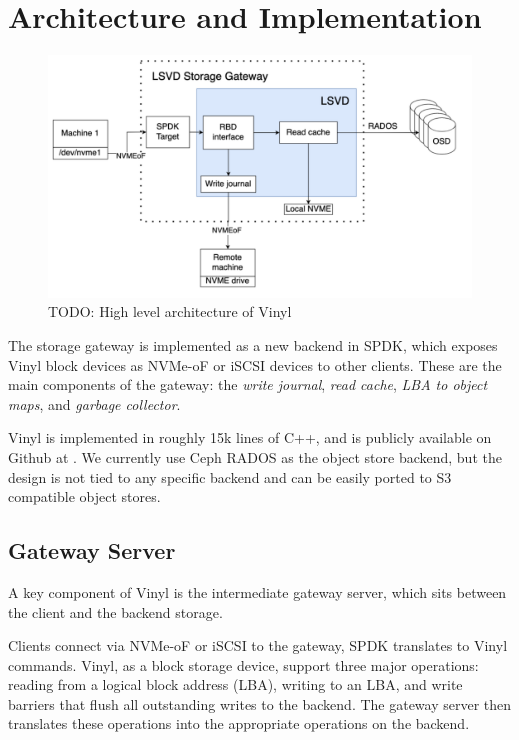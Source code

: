 \section{Architecture and Implementation} \label{sec:architecture}

\begin{figure}
	\centering
	\includegraphics[width=1\linewidth]{figs/lsvd-highlv-arch.png}
	\caption[short]{TODO: High level architecture of Vinyl}
\end{figure}

The storage gateway is implemented as a new backend in SPDK, which exposes
Vinyl block devices as NVMe-oF or iSCSI devices to other clients. These are the
main components of the gateway: the \textit{write journal}, \textit{read cache},
\textit{LBA to object maps}, and \textit{garbage collector}.

Vinyl is implemented in roughly 15k lines of C++, and is publicly available on
Github at . We currently use
Ceph RADOS as the object store backend, but the design is not tied to any
specific backend and can be easily ported to S3 compatible object stores.

\subsection{Gateway Server}

A key component of Vinyl is the intermediate gateway server, which sits between
the client and the backend storage.

Clients connect via NVMe-oF or iSCSI to the gateway, SPDK translates to Vinyl
commands. Vinyl, as a block storage device, support three major operations:
reading from a logical block address (LBA), writing to an LBA, and write
barriers that flush all outstanding writes to the backend. The gateway server
then translates these operations into the appropriate operations on the backend.

